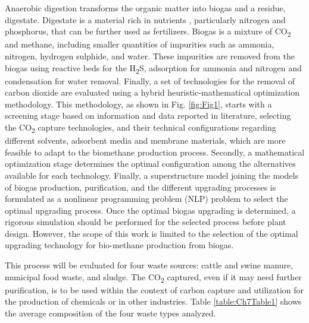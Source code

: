 \begin{refsection}[referencesCh7]
Anaerobic digestion transforms the organic matter into biogas and a residue, digestate. Digestate is a material rich in nutrients \citep{leon2016optimal}, particularly nitrogen and phosphorus, that can be further used as fertilizers. Biogas is a mixture of CO\textsubscript{2} and methane, including smaller quantities of impurities such as ammonia, nitrogen, hydrogen sulphide, and water. These impurities are removed from the biogas using reactive beds for the H\textsubscript{2}S, adsorption for ammonia and nitrogen and condensation for water removal. Finally, a set of technologies for the removal of carbon dioxide are evaluated using a hybrid heuristic-mathematical optimization methodology. This methodology, as shown in Fig. \ref{fig:Fig1}, starts with a screening stage based on information and data reported in literature, selecting the CO\textsubscript{2} capture technologies, and their technical configurations regarding different solvents, adsorbent media and membrane materials, which are more feasible to adapt to the biomethane production process. Secondly, a mathematical optimization stage determines the optimal configuration among the alternatives available for each technology. Finally, a superstructure model joining the models of biogas production, purification, and the different upgrading processes is formulated as a nonlinear programming problem (NLP) problem \citep{trespalacios2014review} to select the optimal upgrading process. Once the optimal biogas upgrading is determined, a rigorous simulation should be performed for the selected process before plant design. However, the scope of this work is limited to the selection of the optimal upgrading technology for bio-methane production from biogas.

This process will be evaluated for four waste sources: cattle and swine manure, municipal food waste, and sludge. The CO\textsubscript{2} captured, even if it may need further purification, is to be used within the context of carbon capture and utilization for the production of chemicals or in other industries. Table \ref{table:Ch7Table1} shows the average composition of the four waste types analyzed.


\end{refsection}
